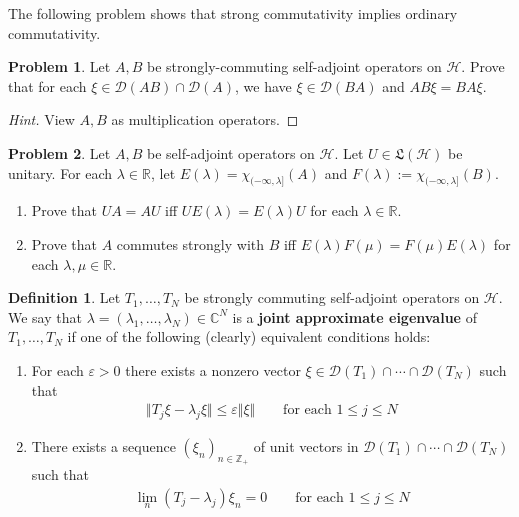 \documentclass[12pt,b5paper,notitlepage]{article}
\theoremstyle{definition}
\newtheorem{df}{Definition}[subsection]
\newtheorem{prob}{\color{red}Problem}[section]
\theoremstyle{plain}
\newcommand{\fk}{\mathfrak}
\newcommand{\Dom}{\mathscr{D}}
\newcommand{\Cbb}{\mathbb C}
\newcommand{\Zbb}{\mathbb Z}
\newcommand{\Rbb}{\mathbb R}
\newcommand{\eps}{\varepsilon}
\newcommand{\MH}{\mathcal H}
\numberwithin{equation}{section}
\begin{document}
The following problem shows that strong commutativity implies ordinary commutativity.

\begin{prob}\label{lb553}
Let $A,B$ be strongly-commuting self-adjoint operators on $\MH$. Prove that for each $\xi\in\Dom(AB)\cap\Dom(A)$, we have $\xi\in\Dom(BA)$ and $AB\xi=BA\xi$.
\end{prob}

\begin{proof}[Hint]
View $A,B$ as multiplication operators.
\end{proof}


\begin{prob}
Let $A,B$ be self-adjoint operators on $\MH$. Let $U\in\fk L(\MH)$ be unitary. For each $\lambda\in\Rbb$, let $E(\lambda)=\chi_{(-\infty,\lambda]}(A)$ and $F(\lambda):=\chi_{(-\infty,\lambda]}(B)$.
\begin{enumerate}
\item Prove that $UA=AU$ iff $UE(\lambda)=E(\lambda)U$ for each $\lambda\in\Rbb$.
\item Prove that $A$ commutes strongly with $B$ iff $E(\lambda)F(\mu)=F(\mu)E(\lambda)$ for each $\lambda,\mu\in\Rbb$.
\end{enumerate}
\end{prob}





\begin{df}
Let $T_1,\dots,T_N$ be strongly commuting self-adjoint operators on $\MH$. We say that $\lambda=(\lambda_1,\dots,\lambda_N)\in\Cbb^N$ is a \textbf{joint approximate eigenvalue}  of $T_1,\dots,T_N$ if one of the following (clearly) equivalent conditions holds:
\begin{enumerate}
\item[(1)] For each $\eps>0$ there exists a nonzero vector $\xi\in\Dom(T_1)\cap\cdots\cap\Dom(T_N)$ such that
\begin{align*}
\Vert T_j\xi-\lambda_j\xi\Vert\leq\eps\Vert\xi\Vert\qquad\text{for each $1\leq j\leq N$}
\end{align*}
\item[(2)] There exists a sequence $(\xi_n)_{n\in\Zbb_+}$ of unit vectors in $\Dom(T_1)\cap\cdots\cap\Dom(T_N)$ such that
\begin{align*}
\lim_n (T_j-\lambda_j)\xi_n=0\qquad\text{for each $1\leq j\leq N$}
\end{align*}
\end{enumerate}
\end{df}
\end{document}
